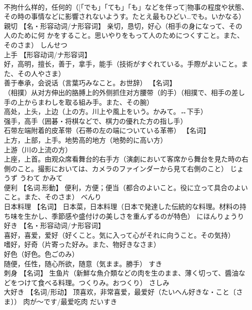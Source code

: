 \documentclass[8pt]{extreport}
\begin{document}
\begin{CJK}{UTF8}{min}
\\	不拘什么样的，任何的（[「でも」「ても」「も」などを伴って]物事の程度や状態、その時の事情などに影響されないようす。たとえ最もひどい…でも。いかなる）		
\\	親切	【名・形容动词/ナ形容词】 亲切，恳切，好心（相手の身になって、その人のために何 かをすること。思いやりをもって人のためにつくすこと。また、そのさま）	しんせつ	
\\	上手	【形容动词/ナ形容词】 
\\	好，高明，擅长，善于，拿手，能手（技術がすぐれている。手際がよいこと。また、その人やさま） 
\\	善于奉承，会说话（言葉巧みなこと。お世辞） 【名词】 
\\	（相撲）从对方伸出的胳膊上的外侧抓住对方腰带（的手）（相撲で、相手の差し手の上からまわしを取る組み手。また、その腕） 
\\	高处，上头，上边（上の方。川上や風上をいう。かみて。↔下手） 
\\	强手，高手（囲碁・将棋などで、棋力の優れた方の指し手） 
\\	石带左端附着的皮革带（石帯の左の端についている革帯） 【名词】 
\\	上方，上部，上手。地势高的地方（地勢的に高い方） 
\\	上游（川の上流の方） 
\\	上座，上首。由观众席看舞台的右手方（演劇において客席から舞台を見た時の右側のこと。撮影においては、カメラのファインダーから見て右側のこと）	じょうず うわて かみて	
\\	便利	【名词.形動】 便利，方便；便当（都合のよいこと。役に立って具合のよいこと。また、そのさま）	べんり	
\\	日本料理	【名词】 日本菜，日本料理（日本で発達した伝統的な料理。材料の持ち味を生かし、季節感や盛付けの美しさを重んずるのが特色）	にほんりょうり	
\\	好き	【名・形容动词/ナ形容词】 
\\	喜好，喜爱，爱好（好くこと。気に入って心がそれに向うこと。その気持） 
\\	嗜好，好奇（片寄った好み。また、物好きなさま） 
\\	好色（好色。色ごのみ） 
\\	随便，任性，随心所欲，随意（気まま。勝手）	すき	
\\	刺身	【名词】 生鱼片（新鮮な魚介類などの肉を生のまま、薄く切って、醬油などをつけて食べる料理。つくりみ。おつくり）	さしみ	
\\	大好き	【名词/形动】 顶喜欢，非常喜爱，最爱好（たいへん好きな・こと〔さま〕） 肉が～です/最爱吃肉	だいすき	

\end{CJK}
\end{document}
